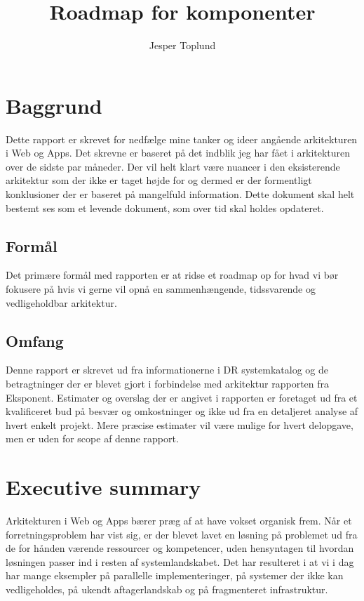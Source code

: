 \documentclass{article}
\author {Jesper Toplund}
\title{Roadmap for komponenter}
\date{}
\begin{document}
\maketitle

\vspace{20 mm}
\begin{quote}
    \textit{}
\end{quote}

\section{Baggrund}
Dette rapport er skrevet for nedfælge mine tanker og ideer angående arkitekturen i Web og Apps. Det skrevne er baseret på det indblik jeg har fået i arkitekturen over de sidste par måneder. Der vil helt klart være nuancer i den eksisterende arkitektur som der ikke er taget højde for og dermed er der formentligt konklusioner der er baseret på mangelfuld information. Dette dokument skal helt bestemt ses som et levende dokument, som over tid skal holdes opdateret.

\subsection{Formål}
Det primære formål med rapporten er at ridse et roadmap op for hvad vi bør fokusere på hvis vi gerne vil opnå en sammenhængende, tidssvarende og vedligeholdbar arkitektur.

\subsection{Omfang}
Denne rapport er skrevet ud fra informationerne i DR systemkatalog og de betragtninger der er blevet gjort i forbindelse med arkitektur rapporten fra Eksponent. Estimater og overslag der er angivet i rapporten er foretaget ud fra et kvalificeret bud på besvær og omkostninger og ikke ud fra en detaljeret analyse af hvert enkelt projekt. Mere præcise estimater vil være mulige for hvert delopgave, men er uden for scope af denne rapport.

\section{Executive summary}
Arkitekturen i Web og Apps bærer præg af at have vokset organisk frem. Når et forretningsproblem har vist sig, er der blevet lavet en løsning på problemet ud fra de for hånden værende ressourcer og kompetencer, uden hensyntagen til hvordan løsningen passer ind i resten af systemlandskabet. Det har resulteret i at vi i dag har mange eksempler på parallelle implementeringer, på systemer der ikke kan vedligeholdes, på ukendt aftagerlandskab og på fragmenteret infrastruktur.
\end{document}
